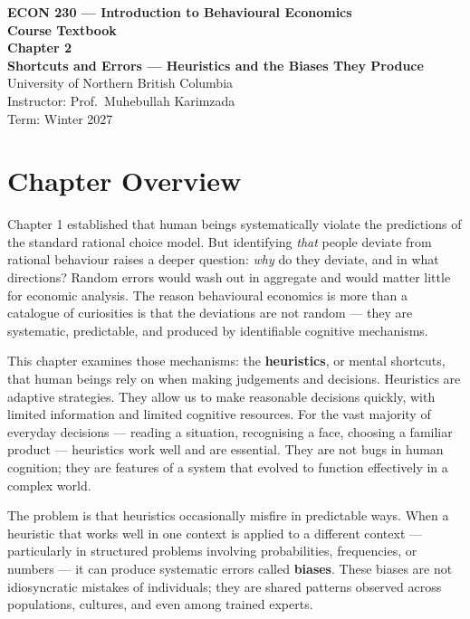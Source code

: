 \documentclass[12pt, letterpaper]{article}
\begin{document}
\begin{titlepage}
\centering\vspace*{3cm}
{\Large\bfseries\color{econblue} ECON 230 --- Introduction to Behavioural Economics\\[1em]}
{\large\bfseries Course Textbook\\[2em]}
{\LARGE\bfseries\color{econblue} Chapter 2\\[0.5em]}
{\Large\bfseries Shortcuts and Errors --- Heuristics and the Biases They Produce\\[2em]}
\vfill
{\normalsize University of Northern British Columbia\\
Instructor: Prof.\ Muhebullah Karimzada\\
Term: Winter 2027}
\end{titlepage}
\tableofcontents
\newpage


\medskip


\section*{Chapter Overview}


Chapter 1 established that human beings systematically violate the predictions of the standard rational choice model. But identifying \textit{that} people deviate from rational behaviour raises a deeper question: \textit{why} do they deviate, and in what directions? Random errors would wash out in aggregate and would matter little for economic analysis. The reason behavioural economics is more than a catalogue of curiosities is that the deviations are not random --- they are systematic, predictable, and produced by identifiable cognitive mechanisms.

This chapter examines those mechanisms: the \textbf{heuristics}, or mental shortcuts, that human beings rely on when making judgements and decisions. Heuristics are adaptive strategies. They allow us to make reasonable decisions quickly, with limited information and limited cognitive resources. For the vast majority of everyday decisions --- reading a situation, recognising a face, choosing a familiar product --- heuristics work well and are essential. They are not bugs in human cognition; they are features of a system that evolved to function effectively in a complex world.

The problem is that heuristics occasionally misfire in predictable ways. When a heuristic that works well in one context is applied to a different context --- particularly in structured problems involving probabilities, frequencies, or numbers --- it can produce systematic errors called \textbf{biases}. These biases are not idiosyncratic mistakes of individuals; they are shared patterns observed across populations, cultures, and even among trained experts.
\end{document}

